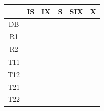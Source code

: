 \begin{note}
\begin{enumerate}[a)]
\begin{tabular}{|c|c|c|c|c|c|}
	\hline
	& IS & IX & S & SIX & X \\
	\hline
	DB &  &  &  &  &  \\
	\hline
	R1 &  &  &  &  &  \\
	\hline
	R2 &  &  &  &  &  \\
	\hline
	T11 &  &  &  &  &  \\
	\hline
	T12 &  &  &  &  &  \\
	\hline
	T21 &  &  &  &  &  \\
	\hline
	T22 &  &  &  &  &  \\
	\hline
\end{tabular}

\end{enumerate}
\end{note}
